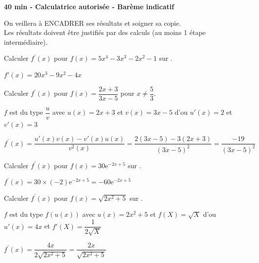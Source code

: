 \documentclass[11pt,a4paper]{article}  %
\begin{document}
	\graphicspath{{images/}}
	
	\begin{center}
		
	\end{center}
	\begin{center}\textbf{40 min - Calculatrice autorisée - Barème indicatif}\\
	\end{center}
	
	\begin{center}
		On veillera à ENCADRER ses résultats et soigner sa copie.\\
		Les résultats doivent être justifiés par des calculs (au moins 1 étape intermédiaire).
	\end{center}
	

\begin{enumMet}
	\item Calculer $f^{\prime}(x)$ pour $f(x)=5 x^4-3 x^3-2x^2-1$ sur \R. 
	\begin{corrBox}
		$f'(x)=20x^3-9x^2-4x$		
	\end{corrBox}
	\item Calculer $f^{\prime}(x)$ pour $f(x)=\dfrac{2x+3}{3x-5}$ pour $x \neq \dfrac{5}{3}$.
	\begin{corrBox}
		$f$ est du type $\dfrac{u}{v}$ avec $u(x)=2x+3$ et $v(x)=3x-5$ d'ou $u'(x)=2$ et $v'(x)=3$
		
		$f^{\prime}(x)=\dfrac{u'(x)v(x)-v'(x)u(x)}{v^2(x)}=\dfrac{2(3x-5)-3(2x+3)}{(3x-5)^2}=\dfrac{-19}{(3x-5)^2}$		
	\end{corrBox}
	\item Calculer $f^{\prime}(x)$ pour $f(x)=30 \mathrm{e}^{-2 x+5}$ sur \R. 
	\begin{corrBox}
		$f^{\prime}(x)=30\times (-2)\mathrm{e}^{-2x+5}=-60\mathrm{e}^{-2x+5}$		
	\end{corrBox}
	\item Calculer $f^{\prime}(x)$ pour $f(x)=\sqrt{2x^2+5}$ sur \R.
	\begin{corrBox}
		$f$ est du type $f(u(x))$ avec $u(x)=2x^2+5$ et $f(X)=\sqrt{X}$ d'ou $u'(x)=4x$ et $f'(X)=\dfrac{1}{2\sqrt{X}}$ 
		
		$f^{\prime}(x)=\dfrac{4x}{2\sqrt{2x^2+5}}=\dfrac{2x}{\sqrt{2x^2+5}}$		
	\end{corrBox}
\end{enumMet}
\end{document}
